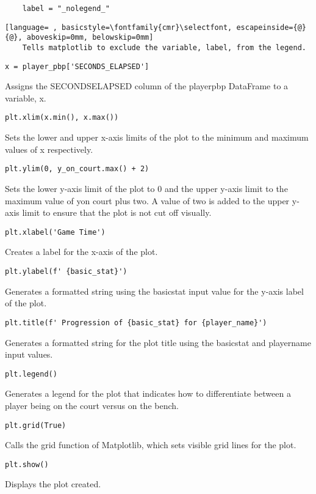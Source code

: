 \documentclass{article}
\begin{document}
\begin{lstlisting}
    label = "_nolegend_"
\end{lstlisting}
\begin{lstlisting}[language= , basicstyle=\fontfamily{cmr}\selectfont, escapeinside={@}{@}, aboveskip=0mm, belowskip=0mm]
    Tells matplotlib to exclude the variable, label, from the legend.
\end{lstlisting}
\begin{lstlisting}
x = player_pbp['SECONDS_ELAPSED']
\end{lstlisting}
Assigns the SECONDS\textunderscore ELAPSED column of the player\textunderscore pbp DataFrame to a variable, x.
\begin{lstlisting}
plt.xlim(x.min(), x.max())
\end{lstlisting}
Sets the lower and upper x-axis limits of the plot to the minimum and maximum values of x respectively.
\begin{lstlisting}
plt.ylim(0, y_on_court.max() + 2)
\end{lstlisting}
Sets the lower y-axis limit of the plot to 0 and the upper y-axis limit to the maximum value of y\textunderscore on \textunderscore court plus two. A value of two is added to the upper y-axis limit to ensure that the plot is not cut off visually.
\begin{lstlisting}
plt.xlabel('Game Time')
\end{lstlisting}
Creates a label for the x-axis of the plot.
\begin{lstlisting}
plt.ylabel(f' {basic_stat}')
\end{lstlisting}
Generates a formatted string using the basic\textunderscore stat input value for the y-axis label of the plot.
\begin{lstlisting}
plt.title(f' Progression of {basic_stat} for {player_name}')
\end{lstlisting}
Generates a formatted string for the plot title using the basic\textunderscore stat and player\textunderscore name input values.
\begin{lstlisting}
plt.legend()
\end{lstlisting}
Generates a legend for the plot that indicates how to differentiate between a player being on the court versus on the bench.
\begin{lstlisting}
plt.grid(True)
\end{lstlisting}
Calls the grid function of Matplotlib, which sets visible grid lines for the plot.
\begin{lstlisting}
plt.show()
\end{lstlisting}
Displays the plot created.
\end{document}
